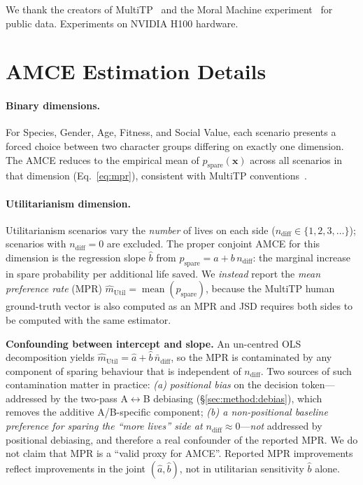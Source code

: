 \documentclass{article}
\begin{document}
\begin{ack}
We thank the creators of MultiTP~\citep{jin2025multitp} and the Moral Machine
experiment~\citep{awad2018moral} for public data. Experiments on NVIDIA H100 hardware.
\end{ack}




\newpage
\appendix

\section{AMCE Estimation Details}
\label{app:amce}

\paragraph{Binary dimensions.} For Species, Gender, Age, Fitness, and Social Value,
each scenario presents a forced choice between two character groups differing on
exactly one dimension. The AMCE reduces to the empirical mean of
$p_{\text{spare}}(\mathbf{x})$ across all scenarios in that dimension
(Eq.~\ref{eq:mpr}), consistent with MultiTP conventions~\citep{jin2025multitp}.

\paragraph{Utilitarianism dimension.} Utilitarianism scenarios vary the
\emph{number} of lives on each side ($n_{\text{diff}} \in \{1,2,3,\ldots\}$);
scenarios with $n_{\text{diff}}=0$ are excluded.
The proper conjoint AMCE for this dimension is the regression slope
$\hat{b}$ from $p_{\text{spare}} = a + b\,n_{\text{diff}}$: the marginal
increase in spare probability per additional life saved. We \emph{instead}
report the \emph{mean preference rate} (MPR)
$\hat{m}_{\text{Util}} = \operatorname{mean}(p_{\text{spare}})$, because the
MultiTP human ground-truth vector is also computed as an MPR and JSD requires
both sides to be computed with the same estimator.

\textbf{Confounding between intercept and slope.}
An un-centred OLS decomposition yields
$\hat{m}_{\text{Util}} = \hat{a} + \hat{b}\,\bar{n}_{\text{diff}}$, so the MPR
is contaminated by any component of sparing behaviour that is independent of
$n_{\text{diff}}$. Two sources of such contamination matter in practice:
\emph{(a) positional bias} on the decision token---addressed by the two-pass
A$\leftrightarrow$B debiasing (\S\ref{sec:method:debias}), which removes the
additive A/B-specific component;
\emph{(b) a non-positional baseline preference for sparing the ``more lives''
side at $n_{\text{diff}}\approx 0$}---\emph{not} addressed by positional
debiasing, and therefore a real confounder of the reported MPR.
We do not claim that MPR is a ``valid proxy for AMCE''. Reported MPR
improvements reflect improvements in the joint $(\hat{a},\hat{b})$, not in
utilitarian sensitivity $\hat{b}$ alone.
\end{document}
